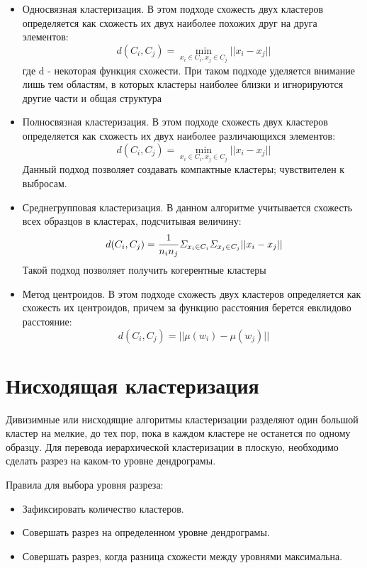 \documentclass[12pt, a4paper]{article}
\begin{document}
\begin{itemize}
\item Односвязная кластеризация. В этом подходе схожесть двух кластеров определяется как схожесть их двух наиболее похожих друг на друга элементов:
\[
\ d(C_i, C_j) =  \min_{x_i \in C_i, x_j \in C_j} ||x_i - x_j||
\]
где d - некоторая функция схожести. При таком подходе уделяется внимание лишь тем областям, в которых кластеры наиболее близки и игнорируются другие части и общая структура
\item Полносвязная кластеризация. В этом подходе схожесть двух кластеров определяется как схожесть их двух наиболее различающихся элементов:
\[
\ d(C_i, C_j) =  \min_{x_i \in C_i, x_j \in C_j} ||x_i - x_j||
\]
Данный подход позволяет создавать компактные кластеры; чувствителен к выбросам.
\item Среднегрупповая кластеризация. В данном алгоритме учитывается схожесть всех образцов в кластерах, подсчитывая величину:
\[
\ d(C_i, C_j) = \frac{1}{n_{i}n_{j}}{\mit\Sigma}_{x_i \in C_i}{\mit\Sigma}_{x_j \in C_j}||x_i - x_j||
\]
Такой подход позволяет получить когерентные кластеры
\item Метод центроидов. В этом подходе схожесть двух кластеров определяется как схожесть их центроидов, причем за функцию расстояния берется евклидово расстояние:
\[
\ d(C_i, C_j) =||\mu(w_i)-\mu(w_j)||
\]
\end{itemize}

\section*{Нисходящая кластеризация}

Дивизимные или нисходящие алгоритмы кластеризации разделяют один большой кластер на мелкие, до тех пор, пока в каждом кластере не останется по одному образцу. Для перевода иерархической кластеризации в плоскую, необходимо сделать разрез на каком-то уровне дендрограмы. 

Правила для выбора уровня разреза:
\begin{itemize} 
\item Зафиксировать количество кластеров.


\item Совершать разрез на определенном уровне дендрограмы. 


\item Совершать разрез, когда разница схожести между уровнями максимальна. 
\end{itemize}
\end{document}
